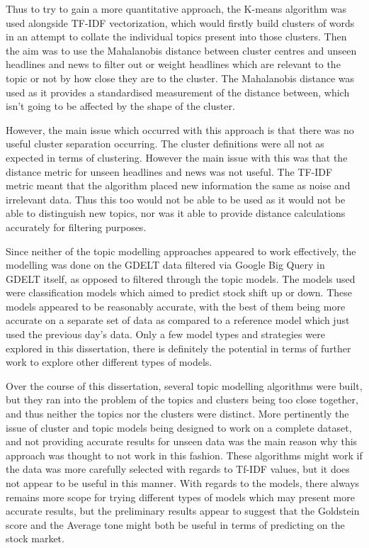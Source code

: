 Thus to try to gain a more quantitative approach, the K-means algorithm was used alongside TF-IDF vectorization, which would  firstly build clusters of words in an attempt to collate the individual topics present into those clusters. Then the aim was to use the Mahalanobis distance between cluster centres and unseen headlines and news to filter out or weight headlines which are relevant to the topic or not by how close they are to the cluster. The Mahalanobis distance was used as it provides a standardised measurement of the distance between, which isn't going to be affected by the shape of the cluster. 

However, the main issue which occurred with this approach is that there was no useful cluster separation occurring. The cluster definitions were all not as expected in terms of clustering. However the main issue with this was that the distance metric for unseen headlines and news was not useful. The TF-IDF metric meant that the algorithm placed new information the same as noise and irrelevant data. Thus this too would not be able to be used as it would not be able to distinguish new topics, nor was it able to provide distance calculations accurately for filtering purposes.

Since neither of the topic modelling approaches appeared to work effectively, the modelling was done on the GDELT data filtered via Google Big Query in GDELT itself, as opposed to filtered through the topic models. The models used were classification models which aimed to predict stock shift up or down. These models appeared to be reasonably accurate, with the best of them being more accurate on a separate set of data as compared to a reference model which just used the previous day's data. Only a few model types and strategies were explored in this dissertation, there is definitely the potential in terms of further work to explore other different types of models.

Over the course of this dissertation, several topic modelling algorithms were built, but they ran into the problem of the topics and clusters being too close together, and thus neither the topics nor the clusters were distinct. More pertinently the issue of cluster and topic models being designed to work on a complete dataset, and not providing accurate results for unseen data was the main reason why this approach was thought to not work in this fashion. These algorithms might work if the data was more carefully selected with regards to Tf-IDF values, but it does not appear to be useful in this manner. With regards to the models, there always remains more scope for trying different types of models which may present more accurate results, but the preliminary results appear to suggest that the Goldstein score and the Average tone might both be useful in terms of predicting on the stock market.


